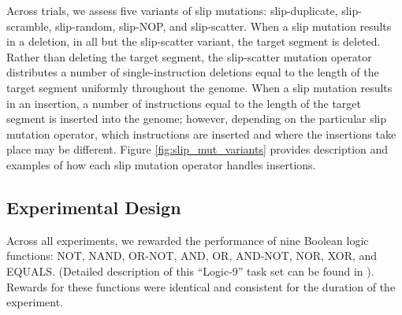 Across trials, we assess five variants of slip mutations: slip-duplicate, slip-scramble, slip-random, slip-NOP, and slip-scatter. When a slip mutation results in a deletion, in all but the slip-scatter variant, the target segment is deleted. Rather than deleting the target segment, the slip-scatter mutation operator distributes a number of single-instruction deletions equal to the length of the target segment uniformly throughout the genome. When a slip mutation results in an insertion, a number of instructions equal to the length of the target segment is inserted into the genome; however, depending on the particular slip mutation operator, which instructions are inserted and where the insertions take place may be different. Figure \ref{fig:slip_mut_variants} provides description and examples of how each slip mutation operator handles insertions. %

\subsection{Experimental Design}

Across all experiments, we rewarded the performance of nine Boolean logic functions: NOT, NAND, OR-NOT, AND, OR, AND-NOT, NOR, XOR, and EQUALS.
(Detailed description of this ``Logic-9'' task set can be found in \citet{lenski2003evolutionary}).
Rewards for these functions were identical and consistent for the duration of the experiment.

